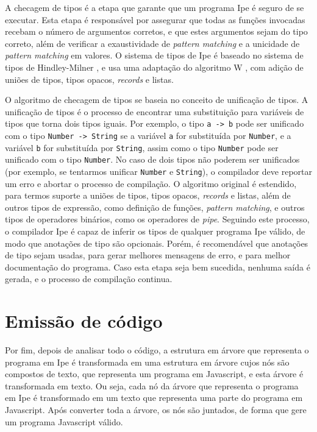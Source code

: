 A checagem de tipos é a etapa que garante que um programa Ipe é seguro de se executar. Esta etapa é
responsável por assegurar que todas as funções invocadas recebam o número de argumentos corretos, e
que estes argumentos sejam do tipo correto, além de verificar a exaustividade de \textit{pattern matching}
e a unicidade de \textit{pattern matching} em valores. O sistema de tipos de Ipe é baseado no sistema
de tipos de Hindley-Milner \cite{principaltypeschemes}, e usa uma adaptação do algoritmo W \cite{understaingalgorithmw},
com adição de uniões de tipos, tipos opacos, \textit{records} e listas.

O algoritmo de checagem de tipos se baseia no conceito de unificação de tipos. A unificação de tipos
é o processo de encontrar uma substituição para variáveis de tipos que torna dois tipos iguais. Por
exemplo, o tipo \texttt{a -> b} pode ser unificado com o tipo \texttt{Number -> String} se a variável
\texttt{a} for substituída por \texttt{Number}, e a variável \texttt{b} for substituída por
\texttt{String}, assim como o tipo \texttt{Number} pode ser unificado com o tipo \texttt{Number}.
No caso de dois tipos não poderem ser unificados (por exemplo, se tentarmos unificar \texttt{Number}
e \texttt{String}), o compilador deve reportar um erro e abortar o processo de compilação. O algoritmo
original é estendido, para termos suporte a uniões de tipos, tipos opacos, \textit{records} e listas,
além de outros tipos de expressão, como definição de funções, \textit{pattern matching}, e outros
tipos de operadores binários, como os operadores de \textit{pipe}. Seguindo este processo, o
compilador Ipe é capaz de inferir os tipos de qualquer programa Ipe válido, de modo que anotações de
tipo são opcionais. Porém, é recomendável que anotações de tipo sejam usadas, para gerar melhores
mensagens de erro, e para melhor documentação do programa. Caso esta etapa seja bem sucedida, nenhuma
saída é gerada, e o processo de compilação continua.


\section{Emissão de código}

Por fim, depois de analisar todo o código, a estrutura em árvore que representa o programa em Ipe é
transformada em uma estrutura em árvore cujos nós são compostos de texto, que representa um programa
em Javascript, e esta árvore é transformada em texto. Ou seja, cada nó da árvore que representa o
programa em Ipe é transformado em um texto que representa uma parte do programa em Javascript. Após
converter toda a árvore, os nós são juntados, de forma que gere um programa Javascript válido.

